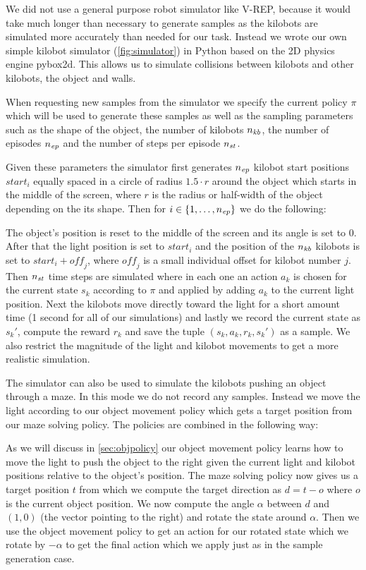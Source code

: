 \documentclass[twoside]{article}
\begin{document}
We did not use a general purpose robot simulator like V-REP\cite{vrep}, because
it would take much longer than necessary to generate samples as the kilobots are
simulated more accurately than needed for our task. Instead we wrote our own
simple kilobot simulator (\autoref{fig:simulator}) in Python based on the 2D
physics engine pybox2d\cite{pybox2d}. This allows us to simulate collisions
between kilobots and other kilobots, the object and walls.

When requesting new samples from the simulator we specify the current policy
$\pi$ which will be used to generate these samples as well as the sampling
parameters such as the shape of the object, the number of kilobots $n_\mathit{kb}$, the
number of episodes $n_\mathit{ep}$ and the number of steps per episode $n_\mathit{st}$.

Given these parameters the simulator first generates $n_\mathit{ep}$ kilobot start
positions $\mathit{start}_i$ equally spaced in a circle of radius $1.5 \cdot r$
around the object which starts in the middle of the screen, where $r$ is the
radius or half-width of the object depending on the its shape. Then for
$i \in \{1, \dots, n_\mathit{ep}\}$ we do the following:

The object's position is reset to the middle of the screen and its angle is set
to 0. After that the light position is set to $\mathit{start}_i$ and the
position of the $n_\mathit{kb}$ kilobots is set to $\mathit{start}_i + \mathit{off}_j$,
where $\mathit{off}_j$ is a small individual offset for kilobot number $j$.
Then $n_\mathit{st}$ time steps are simulated where in each one an action $a_k$ is chosen
for the current state $s_k$ according to $\pi$ and applied by adding $a_k$ to
the current light position. Next the kilobots move directly toward the light for
a short amount time (1 second for all of our simulations) and lastly we record
the current state as $s_k'$, compute the reward $r_k$ and save the tuple $(s_k,
a_k, r_k, s_k')$ as a sample. We also restrict the magnitude of the light and
kilobot movements to get a more realistic simulation.

The simulator can also be used to simulate the kilobots pushing an object
through a maze. In this mode we do not record any samples. Instead we move the
light according to our object movement policy which gets a target position from
our maze solving policy. The policies are combined in the following way:

As we will discuss in \ref{sec:objpolicy} our object movement policy learns
how to move the light to push the object to the right given the current light
and kilobot positions relative to the object's position. The maze solving policy
now gives us a target position $t$ from which we compute the target direction as
$d = t - o$ where $o$ is the current object position. We now compute the angle
$\alpha$ between $d$ and $(1, 0)$ (the vector pointing to the right) and rotate
the state around $\alpha$. Then we use the object movement policy to get an
action for our rotated state which we rotate by $-\alpha$ to get the final
action which we apply just as in the sample generation case.
\end{document}
